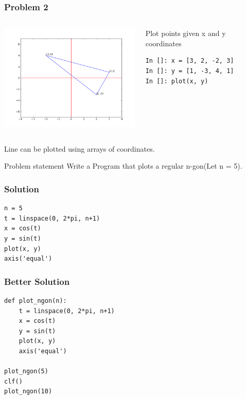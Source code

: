 \documentclass[14pt,compress]{beamer}
\begin{document}
\begin{frame}[fragile]
  \frametitle{Problem 2}
  \begin{columns}
    \hspace*{-0.5in}
    \includegraphics[height=2in, interpolate=true]{data/exercises/triangle}
    \begin{block}{Plot points given x and y coordinates}
    \tiny
    \begin{lstlisting}
In []: x = [3, 2, -2, 3]
In []: y = [1, -3, 4, 1]
In []: plot(x, y)
    \end{lstlisting}
    \end{block}
  \end{columns}
  Line can be plotted using arrays of coordinates.
  \pause
  \begin{block}{Problem statement}
    Write a Program that plots a regular n-gon(Let n = 5).
  \end{block}
\end{frame}

\begin{frame}[fragile]
  \frametitle{Solution}
\begin{lstlisting}
n = 5
t = linspace(0, 2*pi, n+1)
x = cos(t)
y = sin(t)
plot(x, y)
axis('equal')
\end{lstlisting}
\end{frame}

\begin{frame}[fragile]
  \frametitle{Better Solution}
\begin{lstlisting}
def plot_ngon(n):
    t = linspace(0, 2*pi, n+1)
    x = cos(t)
    y = sin(t)
    plot(x, y)
    axis('equal')

plot_ngon(5)
clf()
plot_ngon(10)
\end{lstlisting}
\end{frame}
\end{document}
